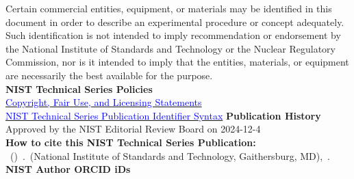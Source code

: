 \begin{titlepage}
\begin{flushleft}
\footnotesize  Certain commercial entities, equipment, or materials may be identified in this document in order to describe an experimental procedure or concept adequately. Such identification is not intended to imply recommendation or endorsement by the National Institute of Standards and Technology or the Nuclear Regulatory Commission, nor is it intended to imply that the entities, materials, or equipment are necessarily the best available for the purpose.\\
\vfill
\footnotesize
{\textbf{NIST Technical Series Policies}}\\
  {{\hyperlink{https://doi.org/10.6028/NIST-TECHPUBS.CROSSMARK-POLICY}{\textcolor{blue}{Copyright, Fair Use, and Licensing Statements}}\\
\hyperlink{https://www.nist.gov/system/files/documents/2022/04/01/PubID_Syntax_NIST_TechPubs.pdf}{\textcolor{blue}{NIST Technical Series Publication Identifier Syntax}}}}
\vfill
{\textbf{Publication History}}\\
  {Approved by the NIST Editorial Review Board on 2024-12-4}\\
\vfill
{\textbf{How to cite this NIST Technical Series Publication:}} \\
  {\authorlist~(\pubyear)~\pubtitle.~(National Institute of Standards and Technology, Gaithersburg, MD),~\pubnumber.~ \DOI}
\vfill
{\textbf{NIST Author ORCID iDs}}\\

\end{flushleft}
\end{titlepage}
